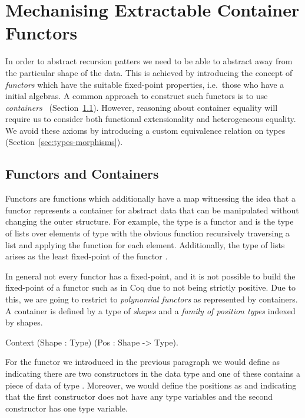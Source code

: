 \documentclass[ a4paper, UKenglish, cleveref, autoref, thm-restate]{lipics-v2021}
\newcommand{\R}{\mathbb{R}}
\newcommand{\operator}[1]{\textsf{#1}}
\begin{document}

\section{Mechanising Extractable Container Functors}
In order to abstract recursion patters we need to be able to abstract away from
the particular shape of the data.  This is achieved by introducing the concept
of \emph{functors} which have the suitable fixed-point properties, i.e.\ those
who have a initial algebras. A common approach to construct such functors is to
use \emph{containers}~\cite{AbbottAG05} (Section~\ref{sec:containers}).
However, reasoning about container equality will require us to consider both
functional extensionality and heterogeneous equality. We avoid these axioms by
introducing a custom equivalence relation on types
(Section~\ref{sec:types-morphisms}).

\subsection{Functors and Containers}
\label{sec:containers}
Functors are functions  which additionally have a
map  witnessing the idea that a
functor represents a container for abstract data that can be manipulated without
changing the outer structure. For example, the type  is
a functor and  is the type of lists over elements of type 
with the obvious  function recursively traversing a list and applying
the function  for each element. Additionally, the type of
lists  arises as the least fixed-point of the
functor .

In general not every functor has a fixed-point, and it is not possible to build
the fixed-point of a functor such as  in Coq due to not being strictly
positive.  Due to this, we are going to restrict to \emph{polynomial functors}
as represented by containers. A container is defined by a type of \emph{shapes}
and a \emph{family of position types} indexed by shapes.
\begin{coqcode}
Context (Shape : Type) (Pos : Shape -> Type).
\end{coqcode}
For the functor  we introduced in the previous paragraph we would
define  as  indicating there are two constructors in
the data type and one of these contains a piece of data of type .
Moreover, we would define the positions as 
and   indicating that the first constructor does not
have any type variables and the second constructor has one type variable.
\end{document}
